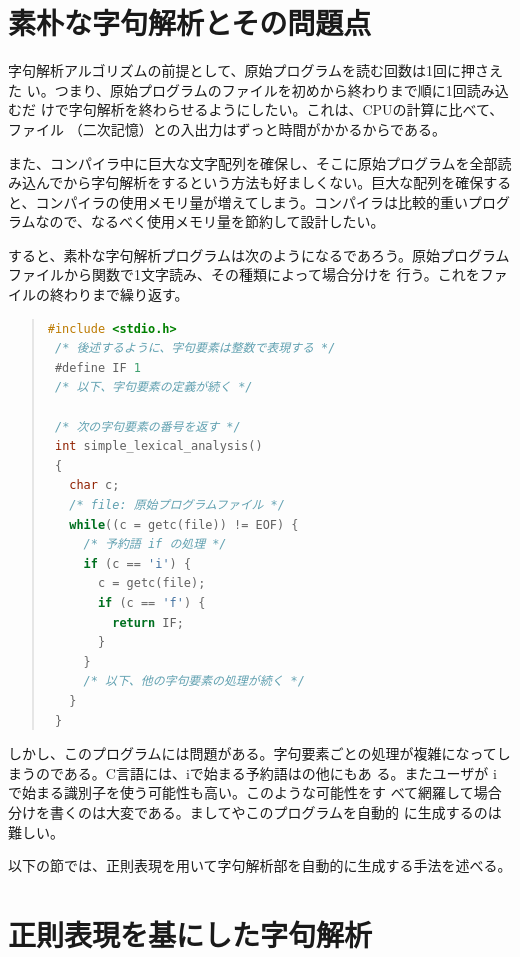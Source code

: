 \section{素朴な字句解析とその問題点}
\label{170323_24Apr06}

字句解析アルゴリズムの前提として、原始プログラムを読む回数は1回に押さえた
い。つまり、原始プログラムのファイルを初めから終わりまで順に1回読み込むだ
けで字句解析を終わらせるようにしたい。これは、CPUの計算に比べて、ファイル
（二次記憶）との入出力はずっと時間がかかるからである。

また、コンパイラ中に巨大な文字配列を確保し、そこに原始プログラムを全部読
み込んでから字句解析をするという方法も好ましくない。巨大な配列を確保する
と、コンパイラの使用メモリ量が増えてしまう。コンパイラは比較的重いプログ
ラムなので、なるべく使用メモリ量を節約して設計したい。

すると、素朴な字句解析プログラムは次のようになるであろう。原始プログラム
ファイルから関数で1文字読み、その種類によって場合分けを
行う。これをファイルの終わりまで繰り返す。

\begin{quote}
\begin{lstlisting}[language=C]
 #include <stdio.h>
 /* 後述するように、字句要素は整数で表現する */
 #define IF 1
 /* 以下、字句要素の定義が続く */

 /* 次の字句要素の番号を返す */
 int simple_lexical_analysis()
 {
   char c;
   /* file: 原始プログラムファイル */
   while((c = getc(file)) != EOF) {
     /* 予約語 if の処理 */
     if (c == 'i') {
       c = getc(file);
       if (c == 'f') {
         return IF;
       }
     }
     /* 以下、他の字句要素の処理が続く */
   }
 }
\end{lstlisting}
\end{quote}

しかし、このプログラムには問題がある。字句要素ごとの処理が複雑になってし
まうのである。C言語には、iで始まる予約語はの他にもあ
る。またユーザが i で始まる識別子を使う可能性も高い。このような可能性をす
べて網羅して場合分けを書くのは大変である。ましてやこのプログラムを自動的
に生成するのは難しい。

以下の節では、正則表現を用いて字句解析部を自動的に生成する手法を述べる。

\section{正則表現を基にした字句解析}
\label{112953_24Apr06}

